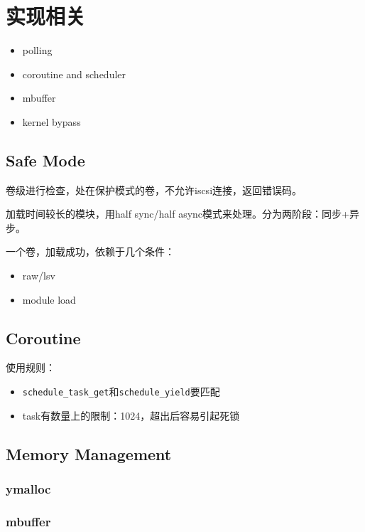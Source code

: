 \chapter{实现相关}

\begin{itemize}
    \item polling
    \item coroutine and scheduler
    \item mbuffer
    \item kernel bypass
\end{itemize}

\section{Safe Mode}

卷级进行检查，处在保护模式的卷，不允许iscsi连接，返回错误码。

加载时间较长的模块，用half sync/half async模式来处理。分为两阶段：同步+异步。

一个卷，加载成功，依赖于几个条件：
\begin{itemize}
    \item raw/lsv
    \item module load
\end{itemize}

\section{Coroutine}

使用规则：
\begin{itemize}
    \item \verb|schedule_task_get|和\verb|schedule_yield|要匹配
    \item task有数量上的限制：1024，超出后容易引起死锁
\end{itemize}

\section{Memory Management}

\subsection{ymalloc}

\subsection{mbuffer}


